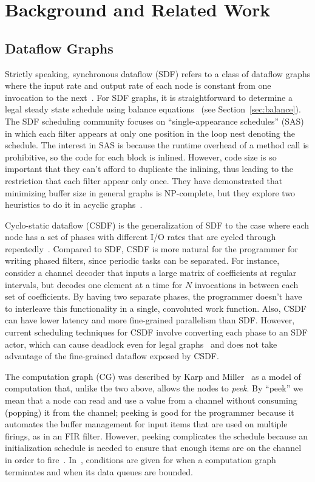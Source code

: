 \section{Background and Related Work}
\label{sec:related}

\subsection{Dataflow Graphs}

Strictly speaking, synchronous dataflow (SDF) refers to a class of
dataflow graphs where the input rate and output rate of each node is
constant from one invocation to the next~\cite{LM87-i,LM87-ii}.  For
SDF graphs, it is straightforward to determine a legal steady state
schedule using balance equations~\cite{leesdf} (see
Section~\ref{sec:balance}).  The SDF scheduling community focuses on
``single-appearance schedules'' (SAS) in which each filter appears at
only one position in the loop nest denoting the schedule.  The
interest in SAS is because the runtime overhead of a method call is
prohibitive, so the code for each block is inlined.  However, code
size is so important that they can't afford to duplicate the inlining,
thus leading to the restriction that each filter appear only once.
They have demonstrated that minimizing buffer size in general graphs
is NP-complete, but they explore two heuristics to do it in acyclic
graphs~\cite{Bhatta97}.

Cyclo-static dataflow (CSDF) is the generalization of SDF to the case
where each node has a set of phases with different I/O rates that are
cycled through repeatedly~\cite{BELP96,Parks95}.  Compared to SDF,
CSDF is more natural for the programmer for writing phased filters,
since periodic tasks can be separated.  For instance, consider a
channel decoder that inputs a large matrix of coefficients at regular
intervals, but decodes one element at a time for $N$ invocations in
between each set of coefficients.  By having two separate phases, the
programmer doesn't have to interleave this functionality in a single,
convoluted work function.  Also, CSDF can have lower latency and more
fine-grained parallelism than SDF.  However, current scheduling
techniques for CSDF involve converting each phase to an SDF actor,
which can cause deadlock even for legal graphs~\cite{BELP96} and does
not take advantage of the fine-grained dataflow exposed by CSDF.

The computation graph (CG) was described by Karp and
Miller~\cite{Karp67} as a model of computation that, unlike the two
above, allows the nodes to {\it peek}.  By ``peek'' we mean that a
node can read and use a value from a channel without consuming
(popping) it from the channel; peeking is good for the programmer
because it automates the buffer management for input items that are
used on multiple firings, as in an FIR filter.  However, peeking
complicates the schedule because an initialization schedule is needed
to ensure that enough items are on the channel in order to
fire~\cite{Gordo02}.  In~\cite{Karp67}, conditions are given for when
a computation graph terminates and when its data queues are bounded.

